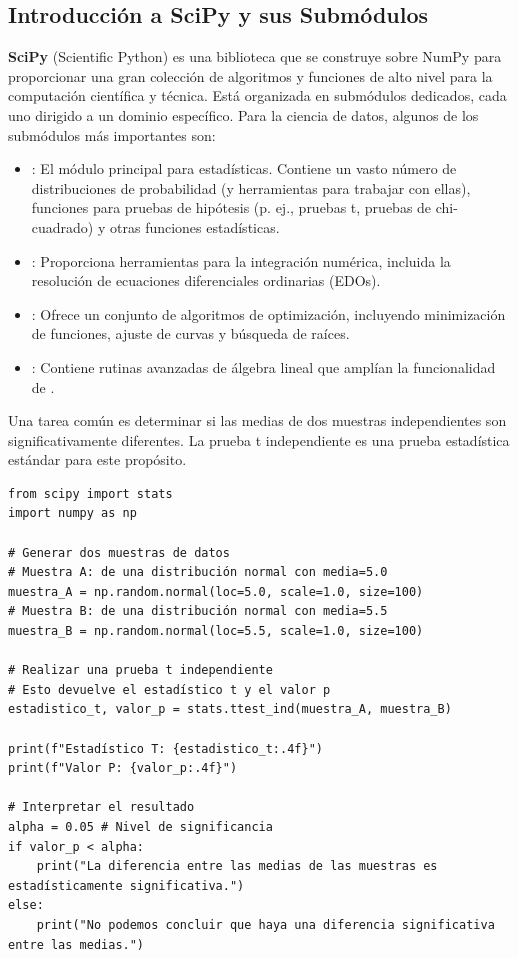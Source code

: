 \subsection{Introducción a SciPy y sus Submódulos}
\label{subsec:scipy_intro}
\textbf{SciPy} (Scientific Python) es una biblioteca que se construye sobre NumPy para proporcionar una gran colección de algoritmos y funciones de alto nivel para la computación científica y técnica. Está organizada en submódulos dedicados, cada uno dirigido a un dominio específico. Para la ciencia de datos, algunos de los submódulos más importantes son:
\begin{itemize}
    \item \textbf{}: El módulo principal para estadísticas. Contiene un vasto número de distribuciones de probabilidad (y herramientas para trabajar con ellas), funciones para pruebas de hipótesis (p. ej., pruebas t, pruebas de chi-cuadrado) y otras funciones estadísticas.
    \item \textbf{}: Proporciona herramientas para la integración numérica, incluida la resolución de ecuaciones diferenciales ordinarias (EDOs).
    \item \textbf{}: Ofrece un conjunto de algoritmos de optimización, incluyendo minimización de funciones, ajuste de curvas y búsqueda de raíces.
    \item \textbf{}: Contiene rutinas avanzadas de álgebra lineal que amplían la funcionalidad de .
\end{itemize}

\begin{example}
Una tarea común es determinar si las medias de dos muestras independientes son significativamente diferentes. La prueba t independiente es una prueba estadística estándar para este propósito.

\text{ }\begin{verbatim}
from scipy import stats
import numpy as np

# Generar dos muestras de datos
# Muestra A: de una distribución normal con media=5.0
muestra_A = np.random.normal(loc=5.0, scale=1.0, size=100)
# Muestra B: de una distribución normal con media=5.5
muestra_B = np.random.normal(loc=5.5, scale=1.0, size=100)

# Realizar una prueba t independiente
# Esto devuelve el estadístico t y el valor p
estadistico_t, valor_p = stats.ttest_ind(muestra_A, muestra_B)

print(f"Estadístico T: {estadistico_t:.4f}")
print(f"Valor P: {valor_p:.4f}")

# Interpretar el resultado
alpha = 0.05 # Nivel de significancia
if valor_p < alpha:
    print("La diferencia entre las medias de las muestras es estadísticamente significativa.")
else:
    print("No podemos concluir que haya una diferencia significativa entre las medias.")
\end{verbatim}
\end{example}

